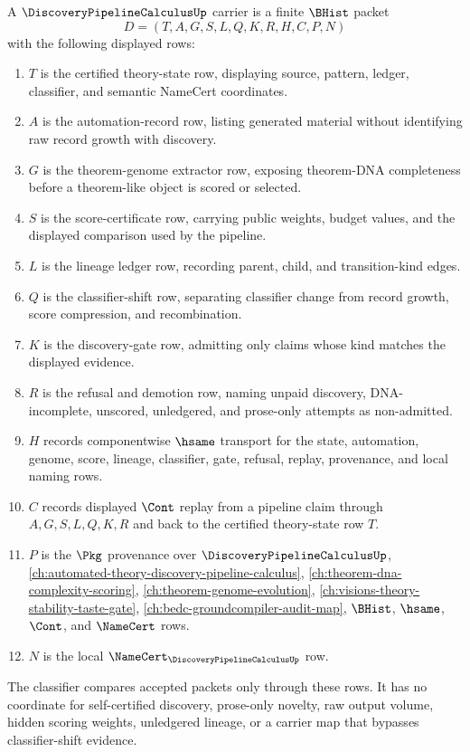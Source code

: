 \begin{definition}
\label{def:discovery-pipeline-calculus-carrier}
A $\DiscoveryPipelineCalculusUp$ carrier is a finite $\BHist$ packet
$$
D=(T,A,G,S,L,Q,K,R,H,C,P,N)
$$
with the following displayed rows:
\begin{enumerate}
\item $T$ is the certified theory-state row, displaying source, pattern, ledger, classifier, and semantic NameCert coordinates.
\item $A$ is the automation-record row, listing generated material without identifying raw record growth with discovery.
\item $G$ is the theorem-genome extractor row, exposing theorem-DNA completeness before a theorem-like object is scored or selected.
\item $S$ is the score-certificate row, carrying public weights, budget values, and the displayed comparison used by the pipeline.
\item $L$ is the lineage ledger row, recording parent, child, and transition-kind edges.
\item $Q$ is the classifier-shift row, separating classifier change from record growth, score compression, and recombination.
\item $K$ is the discovery-gate row, admitting only claims whose kind matches the displayed evidence.
\item $R$ is the refusal and demotion row, naming unpaid discovery, DNA-incomplete, unscored, unledgered, and prose-only attempts as non-admitted.
\item $H$ records componentwise $\hsame$ transport for the state, automation, genome, score, lineage, classifier, gate, refusal, replay, provenance, and local naming rows.
\item $C$ records displayed $\Cont$ replay from a pipeline claim through $A,G,S,L,Q,K,R$ and back to the certified theory-state row $T$.
\item $P$ is the $\Pkg$ provenance over $\DiscoveryPipelineCalculusUp$, \autoref{ch:automated-theory-discovery-pipeline-calculus}, \autoref{ch:theorem-dna-complexity-scoring}, \autoref{ch:theorem-genome-evolution}, \autoref{ch:visions-theory-stability-taste-gate}, \autoref{ch:bedc-groundcompiler-audit-map}, $\BHist$, $\hsame$, $\Cont$, and $\NameCert$ rows.
\item $N$ is the local $\NameCert_{\DiscoveryPipelineCalculusUp}$ row.
\end{enumerate}
The classifier compares accepted packets only through these rows. It has no coordinate for self-certified discovery, prose-only novelty, raw output volume, hidden scoring weights, unledgered lineage, or a carrier map that bypasses classifier-shift evidence.
\end{definition}

